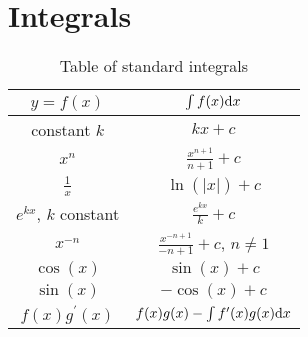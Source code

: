 \section{Integrals}

\begin{table}[ht]
\centering


\caption{Table of standard integrals}

\vspace{2mm}

\label{table: integrals}

\begin{tabular}{|c|c|} 
 \hline
$y=f(x)$ & $\int f(x) \mathrm{d} x$\\
 \hline
 constant $k$ & $kx+c$  \\
 \hline
$x^{n}$ &$\frac{x^{n+1}}{n+1}+c$  \\
\hline
$\frac{1}{x}$ &	$\ln(\vert x\vert )+c$	\\
\hline
$e^{kx}$, $k$ constant &	$\frac{e^{kx}}{k} +c$	\\
\hline
$x^{-n}$ &	$\frac{x^{-n+1}}{-n+1} +c$, $n\neq 1$ 	\\
\hline
$\cos(x)$ & $\sin(x) +c$\\
\hline
$\sin(x)$ & $-\cos(x)+c$\\
\hline
$f(x)g^{\prime}(x)$& $f(x)g(x)-\int f^{\prime}(x)g(x)\mathrm{d} x $\\
\hline
\end{tabular}
\end{table}